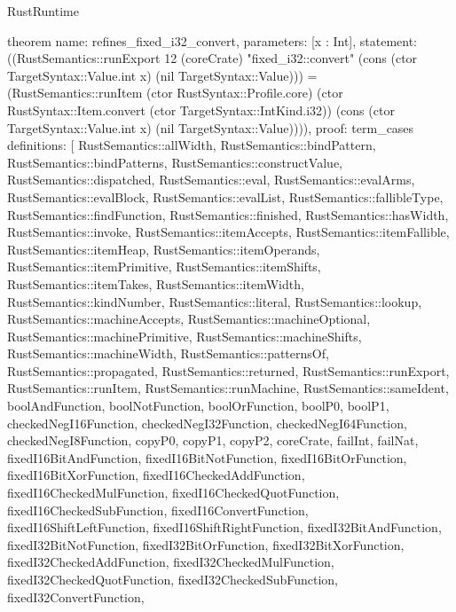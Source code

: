 \begin{lexlean}{RustRuntime}
\begin{semanticmodule}
theorem{
  name: refines_fixed_i32_convert,
  parameters: [x : Int],
  statement: ((RustSemantics::runExport 12 (coreCrate) "fixed_i32::convert" (cons (ctor TargetSyntax::Value.int x) (nil TargetSyntax::Value))) = (RustSemantics::runItem (ctor RustSyntax::Profile.core) (ctor RustSyntax::Item.convert (ctor TargetSyntax::IntKind.i32)) (cons (ctor TargetSyntax::Value.int x) (nil TargetSyntax::Value)))),
  proof: term_cases{
    definitions: [
      RustSemantics::allWidth,
      RustSemantics::bindPattern,
      RustSemantics::bindPatterns,
      RustSemantics::constructValue,
      RustSemantics::dispatched,
      RustSemantics::eval,
      RustSemantics::evalArms,
      RustSemantics::evalBlock,
      RustSemantics::evalList,
      RustSemantics::fallibleType,
      RustSemantics::findFunction,
      RustSemantics::finished,
      RustSemantics::hasWidth,
      RustSemantics::invoke,
      RustSemantics::itemAccepts,
      RustSemantics::itemFallible,
      RustSemantics::itemHeap,
      RustSemantics::itemOperands,
      RustSemantics::itemPrimitive,
      RustSemantics::itemShifts,
      RustSemantics::itemTakes,
      RustSemantics::itemWidth,
      RustSemantics::kindNumber,
      RustSemantics::literal,
      RustSemantics::lookup,
      RustSemantics::machineAccepts,
      RustSemantics::machineOptional,
      RustSemantics::machinePrimitive,
      RustSemantics::machineShifts,
      RustSemantics::machineWidth,
      RustSemantics::patternsOf,
      RustSemantics::propagated,
      RustSemantics::returned,
      RustSemantics::runExport,
      RustSemantics::runItem,
      RustSemantics::runMachine,
      RustSemantics::sameIdent,
      boolAndFunction,
      boolNotFunction,
      boolOrFunction,
      boolP0,
      boolP1,
      checkedNegI16Function,
      checkedNegI32Function,
      checkedNegI64Function,
      checkedNegI8Function,
      copyP0,
      copyP1,
      copyP2,
      coreCrate,
      failInt,
      failNat,
      fixedI16BitAndFunction,
      fixedI16BitNotFunction,
      fixedI16BitOrFunction,
      fixedI16BitXorFunction,
      fixedI16CheckedAddFunction,
      fixedI16CheckedMulFunction,
      fixedI16CheckedQuotFunction,
      fixedI16CheckedSubFunction,
      fixedI16ConvertFunction,
      fixedI16ShiftLeftFunction,
      fixedI16ShiftRightFunction,
      fixedI32BitAndFunction,
      fixedI32BitNotFunction,
      fixedI32BitOrFunction,
      fixedI32BitXorFunction,
      fixedI32CheckedAddFunction,
      fixedI32CheckedMulFunction,
      fixedI32CheckedQuotFunction,
      fixedI32CheckedSubFunction,
      fixedI32ConvertFunction,
}}
\end{semanticmodule}
\end{lexlean}
